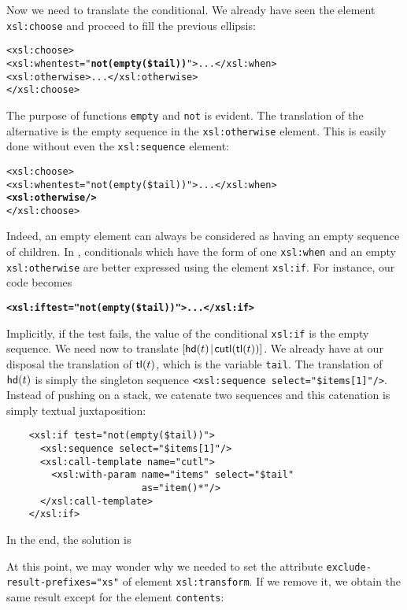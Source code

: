 Now we need to translate the conditional. We already have
seen the element \texttt{xsl:choose} and proceed to fill the previous ellipsis:
\begin{alltt}
    <xsl:choose>
      <xsl:when test="\textbf{not(empty(\$tail))}"> ... </xsl:when>
      <xsl:otherwise> ... </xsl:otherwise>
    </xsl:choose>
\end{alltt}
The purpose of \XPath functions \texttt{empty} and \texttt{not} is
evident. The translation of the  alternative is the empty
sequence in the \texttt{xsl:otherwise} element. This is easily done
without even the \texttt{xsl:sequence} element:
\begin{alltt}
    <xsl:choose>
      <xsl:when test="not(empty(\$tail))"> ... </xsl:when>
      \textbf{<xsl:otherwise/>}
    </xsl:choose>
\end{alltt}
Indeed, an empty element can always be considered as having an empty
sequence of children. In \XSLT, conditionals which have the form of
one \texttt{xsl:when} and an empty \texttt{xsl:otherwise} are better
expressed using the element \texttt{xsl:if}. For instance, our code
becomes
\begin{alltt}
    \textbf{<xsl:if test="not(empty(\$tail))"> ... </xsl:if>}
\end{alltt}
Implicitly, if the test fails, the value of the conditional
\texttt{xsl:if} is the empty sequence. We need now to translate
\([{\textsf{hd}(t)}\!\mid\!{\textsf{cutl}(\textsf{tl}(t))}]\). 
 We already have at our disposal the
translation of \(\textsf{tl}(t)\), which is the \XSLT variable
\texttt{tail}. The translation of \(\textsf{hd}(t)\) is simply the
singleton sequence \texttt{<xsl:sequence
  select="\$items[1]"/>}. Instead of pushing on a stack, we catenate
two sequences and this catenation is simply textual juxtaposition:
\begin{verbatim}
    <xsl:if test="not(empty($tail))">
      <xsl:sequence select="$items[1]"/>
      <xsl:call-template name="cutl">
        <xsl:with-param name="items" select="$tail"
                        as="item()*"/>
      </xsl:call-template>
    </xsl:if>
\end{verbatim}
In the end, the solution is

At this point, we may wonder why we needed to set the attribute
\texttt{exclude-result-prefixes="xs"} of element
\texttt{xsl:transform}. If we remove it, we obtain the same result
except for the element \texttt{contents}:

